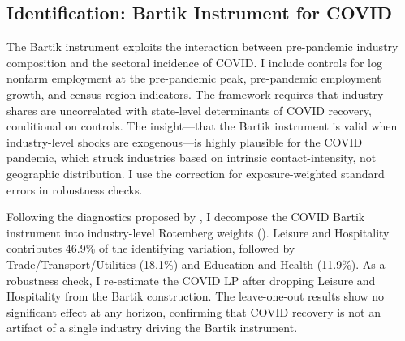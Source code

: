 \documentclass[12pt]{article}
\begin{document}
\subsection{Identification: Bartik Instrument for COVID}

The Bartik instrument exploits the interaction between pre-pandemic industry composition and the sectoral incidence of COVID. I include controls for log nonfarm employment at the pre-pandemic peak, pre-pandemic employment growth, and census region indicators. The \citet{goldsmith2020bartik} framework requires that industry shares are uncorrelated with state-level determinants of COVID recovery, conditional on controls. The \citet{borusyak2022quasi} insight---that the Bartik instrument is valid when industry-level shocks are exogenous---is highly plausible for the COVID pandemic, which struck industries based on intrinsic contact-intensity, not geographic distribution. I use the \citet{adao2019shift} correction for exposure-weighted standard errors in robustness checks.

Following the diagnostics proposed by \citet{goldsmith2020bartik}, I decompose the COVID Bartik instrument into industry-level Rotemberg weights (). Leisure and Hospitality contributes 46.9\% of the identifying variation, followed by Trade/Transport/Utilities (18.1\%) and Education and Health (11.9\%). As a robustness check, I re-estimate the COVID LP after dropping Leisure and Hospitality from the Bartik construction. The leave-one-out results show no significant effect at any horizon, confirming that COVID recovery is not an artifact of a single industry driving the Bartik instrument.
\end{document}
